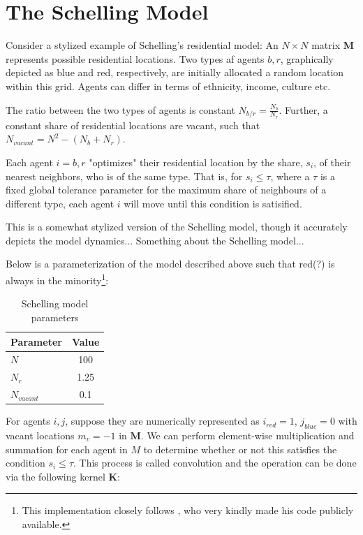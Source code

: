 \documentclass[../main.tex]{subfiles}
\begin{document}
\section{The Schelling Model}

\label{sec:appendix_schelling}

Consider a stylized example of Schelling's residential model: 
An $N \times N$ matrix $\textbf{M}$ represents possible residential locations. Two types af agents $b, r$, graphically depicted as blue and red, respectively, are initially allocated a random location within this grid. Agents can differ in terms of ethnicity, income, culture etc. 

The ratio between the two types of agents is constant $N_{b/r} = \frac{N_b}{N_r}$. Further, a constant share of residential locations are vacant, such that $N_{vacant} = N^2 - (N_b + N_r)$. 

Each agent $i = b, r$ "optimizes" their residential location by the share, $s_i$, of their nearest neighbors, who is of the same type. That is, for $s_i \leq \tau$, where a $\tau$ is a fixed global tolerance parameter for the maximum share of neighbours of a different type, each agent $i$ will move until this condition is satisified. 

This is a somewhat stylized version of the Schelling model, though it accurately depicts the model dynamics... Something about the Schelling model... 

Below is a parameterization of the model described above such that red(?) is always in the minority\footnote{This implementation closely follows \textcite{luca_mingarelli}, who very kindly made his code publicly available.}:

\begin{table}[H]
    \centering
    \caption{Schelling model parameters}
    \begin{tabular}{lc}
    \toprule
      Parameter & Value \\
    \midrule
      $N$         & 100 \\
      $N_r$       & 1.25 \\
      $N_{vacant}$ & 0.1 \\
    \bottomrule
    \end{tabular}
\end{table}

For agents $i, j$, suppose they are numerically represented as $i_{red}=1$, $j_{blue} = 0$ with vacant locations $m_v=-1$ in $\textbf{M}$. We can perform element-wise multiplication and summation for each agent in $M$ to determine whether or not this satisfies the condition $s_i \leq \tau$. This process is called convolution and the operation can be done via the following kernel $\mathbf{K}$:
\end{document}
